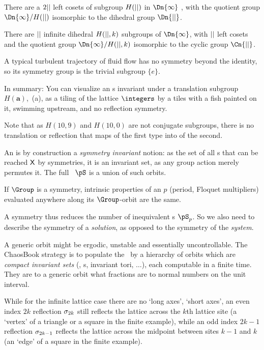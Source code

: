 There are a $2{||}$ left cosets of subgroup $H({||})$ in $\Dn{\infty}$
, with the quotient group $\Dn{\infty}/H(\cl{})$
isomorphic to the dihedral group $\Dn{\cl{}}$.

There are ${||}$ infinite dihedral $H({||},k)$ subgroups  of
$\Dn{\infty}$, with ${||}$ left cosets  
and the quotient group $\Dn{\infty}/H(\cl{},k)$
isomorphic to the cyclic group $\Cn{\cl{}}$.

A typical turbulent trajectory of
fluid flow has no symmetry beyond the identity, so its
symmetry group is the trivial subgroup $\{e\}$.

In summary:
You can visualize an {\lattstate}s invariant under a translation subgroup
$H(\mathbf{a})$, \,(a), as a tiling of the
lattice $\integers$ by a {\lattstate} tiles with a fish painted on it,
swimming upstream, and no reflection symmetry.

Note that as $H(10,9)$ and $H(10,0)$ are not conjugate subgroups,
there is no translation or reflection that maps {\lattstate} of the first type
into {\lattstate} of the second.

An {\orbit} is by construction a {\em symmetry invariant} notion: as
the set of all {\lattstate}s that can be reached $\mathsf{X}$ by symmetries,
it is an invariant set, as any group action merely permutes it.
The full \statesp\ $\pS$ is a union of such orbits.

If $\Group$ is a symmetry, intrinsic properties of
an {\orbit} $p$ (period, Floquet multipliers) evaluated
anywhere along its $\Group$-orbit are the same.

A symmetry thus reduces the number of inequivalent {\lattstate}s $\pS_p$. So
we also need to describe the symmetry of a \emph{solution}, as opposed to
the symmetry of the \emph{system}.

A generic orbit might be ergodic, unstable
and essentially uncontrollable. The ChaosBook strategy is
to populate the \statesp\ by a hierarchy of orbits which are
\emph{compact invariant sets} (\eqva, \po s, invariant tori, $\dots$),
each computable in a finite time.
They are  to
a generic orbit what fractions are to
normal numbers on the unit interval.

While for the infinite lattice case there are no `long axes', `short
axes', an even index $2k$ reflection $\sigma_{2k}$ still reflects the
lattice across the  $k$th lattice site (a `vertex' of a triangle or a
square in the finite example), while an odd index $2k-1$ reflection
$\sigma_{2k-1}$ reflects the lattice across the midpoint between sites  $k-1$
and $k$ (an `edge' of a square in the finite example).

